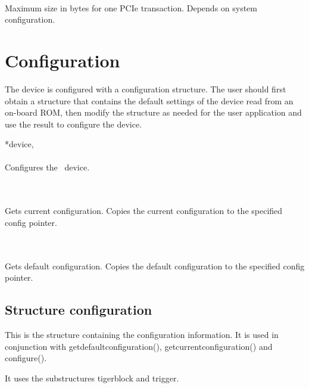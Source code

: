 			\\
			Maximum size in bytes for one PCIe transaction. Depends on system configuration.\par

	\section{Configuration}

		The device is configured with a configuration structure. 
		The user should first obtain a structure that contains the default settings of the device read from an on-board ROM, 
		then modify the structure as needed for the user application and use the result to configure the device.\par

		 {*device,} \\ \\
		Configures the \deviceName\ device.\par

		 \\ \\
		Gets current configuration. Copies the current configuration to the specified config pointer.\par

		 \\ \\
		Gets default configuration. Copies the default configuration to the specified config pointer.\par

		\subsection{Structure \prefix configuration}

			This is the structure containing the configuration information. It is used in conjunction with \textsf{\prefix get\tu default\tu configuration()}, \textsf{\prefix get\tu current\tu configuration()} and \textsf{\prefix configure()}.\par

			It uses the substructures \textsf{\prefix tiger\tu block} and \textsf{\prefix trigger}.\par


